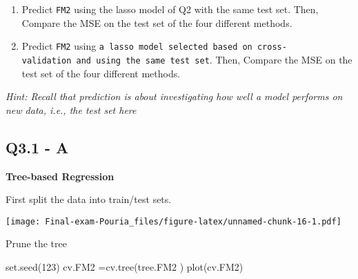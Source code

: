 \documentclass[
]{article}
\newenvironment{Shaded}{\begin{snugshade}}{\end{snugshade}}
\newcommand{\CommentTok}[1]{\textcolor[rgb]{0.56,0.35,0.01}{\textit{#1}}}
\newcommand{\DecValTok}[1]{\textcolor[rgb]{0.00,0.00,0.81}{#1}}
\newcommand{\FloatTok}[1]{\textcolor[rgb]{0.00,0.00,0.81}{#1}}
\newcommand{\FunctionTok}[1]{\textcolor[rgb]{0.00,0.00,0.00}{#1}}
\newcommand{\NormalTok}[1]{#1}
\newcommand{\OtherTok}[1]{\textcolor[rgb]{0.56,0.35,0.01}{#1}}
\newcommand{\SpecialCharTok}[1]{\textcolor[rgb]{0.00,0.00,0.00}{#1}}
\begin{document}
\begin{enumerate}
\def\labelenumi{\arabic{enumi}.}
\setcounter{enumi}{1}
\item
  Predict \texttt{FM2} using the lasso model of Q2 with the same test
  set. Then, Compare the MSE on the test set of the four different
  methods.
\item
  Predict \texttt{FM2} using
  \texttt{a\ lasso\ model\ selected\ based\ on\ cross-validation\ and\ using\ the\ same\ test\ set}.
  Then, Compare the MSE on the test set of the four different methods.
\end{enumerate}

\emph{Hint: Recall that prediction is about investigating how well a
model performs on new data, i.e., the test set here}

\hypertarget{q3.1---a}{%
\subsection{Q3.1 - A}\label{q3.1---a}}

\textbf{Tree-based Regression}

First split the data into train/test sets.

\begin{Shaded}
\end{Shaded}

\texttt{[image: Final-exam-Pouria\_files/figure-latex/unnamed-chunk-16-1.pdf]}

Prune the tree

\begin{Shaded}
\begin{Highlighting}[]
\FunctionTok{set.seed}\NormalTok{(}\DecValTok{123}\NormalTok{)}
\NormalTok{cv.FM2 }\OtherTok{=}\FunctionTok{cv.tree}\NormalTok{(tree.FM2 )}
\FunctionTok{plot}\NormalTok{(cv.FM2)}
\end{Highlighting}
\end{Shaded}
\end{document}
